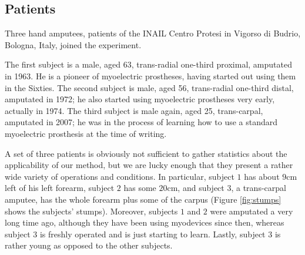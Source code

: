 \subsection{Patients}

Three hand amputees, patients of the INAIL Centro Protesi in Vigorso
di Budrio, Bologna, Italy, joined the experiment.

The first subject is a male, aged 63, trans-radial one-third proximal,
amputated in 1963. He is a pioneer of myoelectric prostheses, having
started out using them in the Sixties. The second subject is male,
aged 56, trans-radial one-third distal, amputated in 1972; he also
started using myoelectric prostheses very early, actually in 1974. The
third subject is male again, aged 25, trans-carpal, amputated in 2007;
he was in the process of learning how to use a standard myoelectric
prosthesis at the time of writing.

A set of three patients is obviously not sufficient to gather
statistics about the applicability of our method, but we are lucky
enough that they present a rather wide variety of operations and
conditions. In particular, subject $1$ has about $9$cm left of his
left forearm, subject $2$ has some $20$cm, and subject $3$, a
trans-carpal amputee, has the whole forearm plus some of the carpus
(Figure \ref{fig:stumps} shows the subjects' stumps). Moreover,
subjects $1$ and $2$ were amputated a very long time ago, although
they have been using myodevices since then, whereas subject $3$ is
freshly operated and is just starting to learn. Lastly, subject $3$ is
rather young as opposed to the other subjects.


